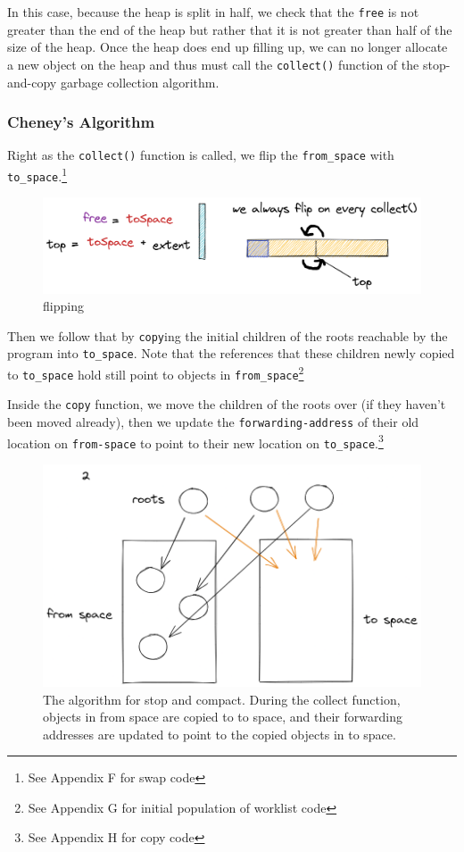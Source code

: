 \documentclass[index]{subfiles}
\begin{document}
In this case, because the heap is split in half, we check that the \verb+free+ is not greater than the end of the heap but rather that it is not greater than half of the size of the heap. Once the heap does end up filling up, we can no longer allocate a new object on the heap and thus must call the \verb+collect()+ function of the stop-and-copy garbage collection algorithm.

\subsubsection{Cheney's Algorithm}

Right as the \verb+collect()+ function is called, we flip the \verb+from_space+ with \verb+to_space+.\footnote{See Appendix F for swap code}

\begin{figure}[H]
    \centering
    \includegraphics[scale=0.25]{pics/flipping.png}
    \caption{flipping}
\end{figure}

Then we follow that by \verb+copy+ing the initial children of the roots reachable by the program into \verb+to_space+. Note that the references that these children newly copied to \verb+to_space+ hold still point to objects in \verb+from_space+\footnote{See Appendix G for initial population of worklist code}

Inside the \verb+copy+ function, we move the children of the roots over (if they haven't been moved already), then we update the \verb+forwarding-address+ of their old location on \verb+from-space+ to point to their new location on \verb+to_space+.\footnote{See Appendix H for copy code}

\begin{figure}[H]
    \centering
    \includegraphics[scale=0.3]{pics/visualization-of-worklist.png}
    \caption{The algorithm for stop and compact. During the collect function, objects in from space are copied to to space, and their forwarding addresses are updated to point to the copied objects in to space.}
\end{figure}
\end{document}
